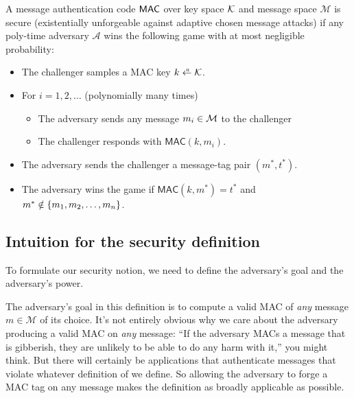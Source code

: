 \begin{definition}\label{def:mac-sec}
A message authentication code $\mathsf{MAC}$ over key space $\mathcal{K}$ and message space $\mathcal{M}$ is secure 
(existentially unforgeable against adaptive chosen
message attacks) if any poly-time adversary
$\mathcal{A}$ wins the following
game with at most negligible probability:
  \begin{itemize}[noitemsep]
    \item The challenger samples a MAC key $k \getsr \calK$.
    \item For $i = 1, 2, \dots$ (polynomially many times)
      \begin{itemize}
        \item The adversary sends any message $m_i \in \mathcal{M}$ 
              to the challenger 
        \item The challenger responds with $\mathsf{MAC}(k, m_i)$. 
      \end{itemize}
    \item The adversary sends the challenger a message-tag pair $(m^*, t^*)$.
    \item The adversary wins the game if $\mathsf{MAC}(k, m^*) = t^*$ and $m^* \notin \left\{ m_1, m_2, \ldots, m_n \right\}$.
  \end{itemize}

\end{definition}

\subsection{Intuition for the security definition}
To formulate our security notion, we need to define
the adversary's goal and the adversary's power.

The adversary's goal in this definition is 
to compute a valid MAC of \emph{any} message $m\in \mathcal{M}$
of its choice.
It's not entirely obvious why we care about the adversary producing 
a valid MAC on \textit{any} message: ``If the
adversary MACs a message that is gibberish, they
are unlikely to be able to do any harm with it,''
you might think. 
But there will certainly be applications
that authenticate messages that violate whatever
definition of  we define.
So allowing the adversary to forge a MAC tag on any 
message makes the definition as broadly applicable as possible.

